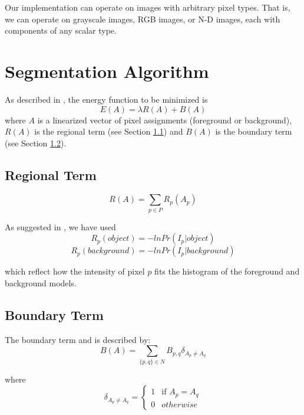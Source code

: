 \documentclass{InsightArticle}
\begin{document}
Our implementation can operate on images with arbitrary pixel types. That is, we can operate on grayscale images, RGB images, or N-D images, each with components of any scalar type.

\section{Segmentation Algorithm}
\label{sec:Algorithm}
As described in \cite{boykov2006}, the energy function to be minimized is
\begin{equation}
 E(A) = \lambda R(A) + B(A)
\end{equation}
where $A$ is a linearized vector of pixel assignments (foreground or background), $R(A)$ is the regional term (see Section \ref{subsec:RegionalTerm}) and $B(A)$ is the boundary term (see Section \ref{subsec:BoundaryTerm}).

\subsection{Regional Term}
\label{subsec:RegionalTerm}
\begin{equation}
 R(A) = \sum_{p \in P} R_p(A_p)
\end{equation}

As suggested in \cite{boykov2006}, we have used
\begin{equation}
 R_p(object) = -ln Pr(I_p|object)
\end{equation}
\begin{equation}
 R_p(background) = -ln Pr(I_p|background)
\end{equation}

which reflect how the intensity of pixel $p$ fits the histogram of the foreground and background models.

\subsection{Boundary Term}
\label{subsec:BoundaryTerm}
The boundary term and is described by:
\begin{equation}
 B(A) = \sum_{ \{p,q\} \in N} B_{p,q} \delta_{A_p\neq A_q}
\end{equation}

where 
\begin{equation*}
\delta_{A_p\neq A_q} =
\begin{cases} 
1 & \text{if } A_p = A_q
\\
0 & otherwise
\end{cases}
\end{equation*}
\end{document}
